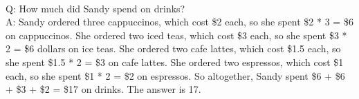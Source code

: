  \\
Q: How much did Sandy spend on drinks? \\
A: Sandy ordered three cappuccinos, which cost \$2 each, so she spent \$2 * 3 = \$6 on cappuccinos. She ordered two iced teas, which cost \$3 each, so she spent \$3 * 2 = \$6 dollars on ice teas. She ordered two cafe lattes, which cost \$1.5 each, so she spent \$1.5 * 2 = \$3 on cafe lattes. She ordered two espressos, which cost \$1 each, so she spent \$1 * 2 = \$2 on espressos. So altogether, Sandy spent \$6 + \$6 + \$3 + \$2 = \$17 on drinks. The answer is 17. \\
